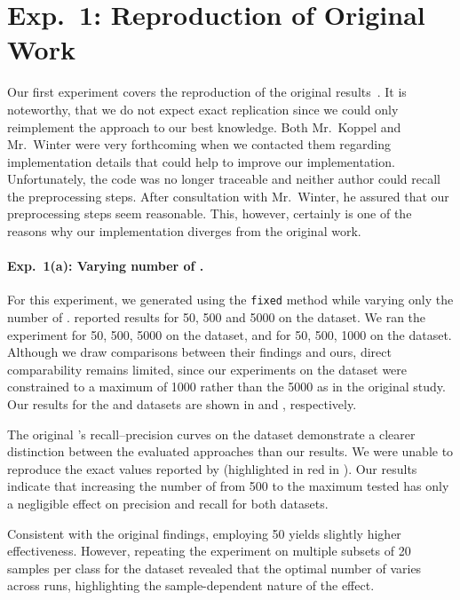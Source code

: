 
\section{Exp.\ 1: Reproduction of Original Work}
\label{sec:reproduction_res}

Our first experiment covers the reproduction of the original results~\citep{koppel_determining_2014}.
It is noteworthy, that we do not expect exact replication since we could only reimplement the approach to our best knowledge.
Both Mr.\ Koppel and Mr.\ Winter were very forthcoming when we contacted them regarding implementation details that could help to improve our implementation.
Unfortunately, the code was no longer traceable and neither author could recall the preprocessing steps.
After consultation with Mr.\ Winter, he assured that our preprocessing steps seem reasonable.
This, however, certainly is one of the reasons why our implementation diverges from the original work.

\paragraph{Exp.\ 1(a): Varying number of \imps{}.}

For this experiment, we generated \imps{} using the \texttt{fixed} method while varying only the number of \imps{}.
\citet{koppel_determining_2014} reported results for 50, 500 and 5000 \imps{} on the \dataBlog{} dataset.
We ran the experiment for 50, 500, 5000 \imps{} on the \dataStudent{} dataset, and for 50, 500, 1000 \imps{} on the \dataBlog{} dataset.
Although we draw comparisons between their findings and ours, direct comparability remains limited, since our experiments on the \dataBlog{} dataset were constrained to a maximum of \num{1000} \imps{} rather than the \num{5000} as in the original study.
Our results for the \dataBlog{} and \dataStudent{} datasets are shown in  and , respectively.

The original \impAppr{}'s recall–precision curves on the \dataBlog{} dataset demonstrate a clearer distinction between the evaluated approaches than our results.
We were unable to reproduce the exact values reported by \citet{koppel_determining_2014} (highlighted in red in ). 
Our results indicate that increasing the number of \imps{} from 500 to the maximum tested has only a negligible effect on precision and recall for both datasets.

Consistent with the original findings, employing 50 \imps{} yields slightly higher effectiveness. 
However, repeating the experiment on multiple subsets of 20 samples per class for the \dataBlog{} dataset revealed that the optimal number of \imps{} varies across runs, highlighting the sample-dependent nature of the effect.


